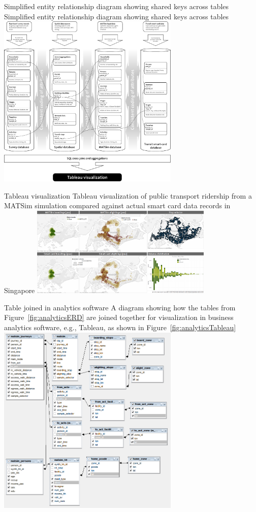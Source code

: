 \createfigure%
{Simplified entity relationship diagram showing shared keys across tables}%
{Simplified entity relationship diagram showing shared keys across tables}%
{\label{fig:analyticsERD}}%
{\includegraphics[width=0.65\textwidth, angle=0]{extending/figures/businessanalytics/schema}}%
{}

\createfigure%
{Tableau visualization}%
{Tableau visualization of public transport ridership from a MATSim simulation compared against actual smart card data records in Singapore}%
{\label{fig:analyticsTableau}}%
{\includegraphics[width=0.65\textwidth, angle=0]{extending/figures/businessanalytics/tableau.png}}%
{}

\createfigure%
{Table joined in analytics software}%
{A diagram showing how the tables from Figure~\ref{fig:analyticsERD} are joined together for visualization in business analytics software, e.g., Tableau, as shown in Figure~\ref{fig:analyticsTableau}}%
{\label{fig:analyticsJoin}}%
{\includegraphics[width=0.65\textwidth, angle=0]{extending/figures/businessanalytics/join}}%
{}

